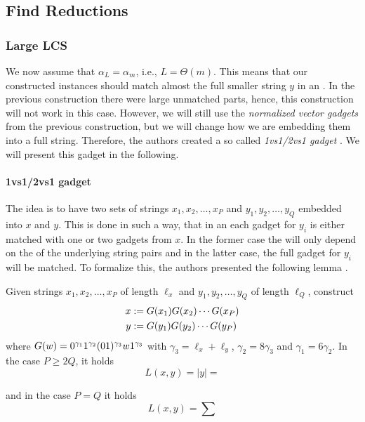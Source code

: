 \subsection{Find Reductions}



\subsubsection{Large LCS}

We now assume that $\alpha_L = \alpha_m$, i.e., $L = \Theta(m)$.
This means that our constructed instances should match almost the full smaller string $y$ in an \lcs{}.
In the previous construction there were large unmatched parts, hence, this construction will not work in this case.
However, we will still use the \emph{normalized vector gadgets} from the previous construction, but we will change how we are embedding them into a full string.
Therefore, the authors created a so called \emph{1vs1/2vs1 gadget} \cite[section 9.2.1]{Bringman.2018}.
We will present this gadget in the following.

\paragraph{1vs1/2vs1 gadget}
The idea is to have two sets of strings $x_1, x_2, \ldots, x_P$ and $y_1, y_2, \ldots, y_Q$ embedded into $x$ and $y$.
This is done in such a way, that in an \lcs{} each gadget for $y_i$ is either matched with one or two gadgets from $x$.
In the former case the \lcs{} will only depend on the \lcs{} of the underlying string pairs and in the latter case, the full gadget for $y_i$ will be matched.
To formalize this, the authors presented the following lemma \cite[Lemma 9.6]{Bringman.2018}.

\begin{lemma}[see ]
Given strings $x_1, x_2, \ldots, x_P$ of length $\ell_x$ and $y_1, y_2, \ldots, y_Q$ of length $\ell_Q$, construct
\begin{align*}
	x &:= G(x_1)G(x_2) \cdots G(x_P)\\
	y &:= G(y_1)G(y_2) \cdots G(y_P)
\end{align*}
where $G(w) = 0^{\gamma_1}1^{\gamma_2}(01)^{\gamma_3}w1^{\gamma_3}$ with $\gamma_3 = \ell_x + \ell_y$, $\gamma_2 = 8\gamma_3$ and $\gamma_1 = 6\gamma_2$. 
In the case $P \geq 2Q$, it holds
\[
	L(x,y) = |y| =
\]

and in the case $P = Q$ it holds
\[
	L(x,y) = \sum
\]
\end{lemma}



